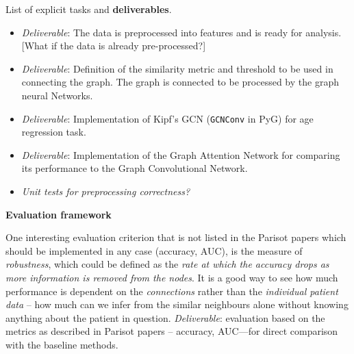 \documentclass[12pt,a4paper,twoside]{article}
\begin{document}
List of explicit tasks and \textbf{deliverables}.
\begin{itemize}
  \item \textit{Deliverable}: The data is preprocessed into features and is ready for analysis. [What if the data is already pre-processed?] %
  \item \textit{Deliverable}: Definition of the similarity metric and threshold to be used in connecting the graph. The graph is connected to be processed by the graph neural Networks.
  \item \textit{Deliverable}: Implementation of Kipf's GCN \cite{kipf2017semi} (\texttt{GCNConv} in PyG) for age regression task.
  \item \textit{Deliverable}: Implementation of the Graph Attention Network for comparing its performance to the Graph Convolutional Network.
  \item \textit{Unit tests for preprocessing correctness?}
\end{itemize}

\textbf{Evaluation framework}

One interesting evaluation criterion that is not listed in the Parisot papers which should be implemented in any case (accuracy, AUC), is the measure of \textit{robustness}, which could be defined as the \textit{rate at which the accuracy drops as more information is removed from the nodes}. It is a good way to see how much performance is dependent on the \textit{connections} rather than the \textit{individual patient data} – how much can we infer from the similar neighbours alone without knowing anything about the patient in question. \textit{Deliverable}: evaluation based on the metrics as described in Parisot papers – accuracy, AUC—for direct comparison with the baseline methods.
\end{document}
